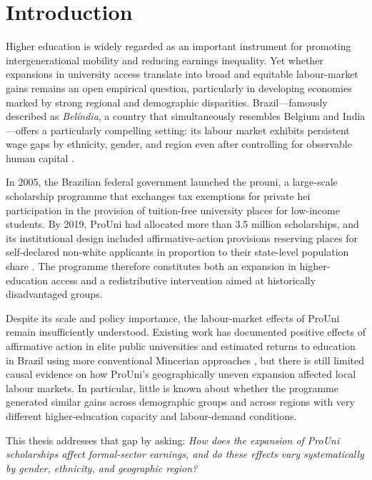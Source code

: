 \clearpage
\section{Introduction}
\label{sec:Intro}

Higher education is widely regarded as an important instrument for promoting intergenerational mobility and reducing earnings inequality. Yet whether expansions in university access translate into broad and equitable labour-market gains remains an open empirical question, particularly in developing economies marked by strong regional and demographic disparities. Brazil---famously described as \emph{Belíndia}, a country that simultaneously resembles Belgium and India \cite{bacha1976}---offers a particularly compelling setting: its labour market exhibits persistent wage gaps by ethnicity, gender, and region even after controlling for observable human capital \cite{AriasYamadaTejerina2002, Telles2004, deoliveira2021}.

In 2005, the Brazilian federal government launched the \acrfull{prouni}, a large-scale scholarship programme that exchanges tax exemptions for private \acrfull{hei} participation in the provision of tuition-free university places for low-income students. By 2019, ProUni had allocated more than 3.5 million scholarships, and its institutional design included affirmative-action provisions reserving places for self-declared non-white applicants in proportion to their state-level population share \cite{MEC2024}. The programme therefore constitutes both an expansion in higher-education access and a redistributive intervention aimed at historically disadvantaged groups.

Despite its scale and policy importance, the labour-market effects of ProUni remain insufficiently understood. Existing work has documented positive effects of affirmative action in elite public universities \cite{RiehlMachadoReyes2023} and estimated returns to education in Brazil using more conventional Mincerian approaches \cite{Card1999, Mincer1974}, but there is still limited causal evidence on how ProUni's geographically uneven expansion affected local labour markets. In particular, little is known about whether the programme generated similar gains across demographic groups and across regions with very different higher-education capacity and labour-demand conditions.

This thesis addresses that gap by asking: \emph{How does the expansion of ProUni scholarships affect formal-sector earnings, and do these effects vary systematically by gender, ethnicity, and geographic region?}

